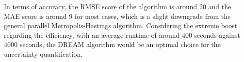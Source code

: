 In terms of accuracy, the RMSE score of the algorithm is around $20$ and the MAE score is around $9$ for most cases, which is a slight downgrade from the general parallel Metropolis-Hastings algorithm. Considering the extreme boost regarding the efficiency, with an average runtime of around $400$ seconds against $4000$ seconds, the DREAM algorithm would be an optimal choice for the uncertainty quantification.